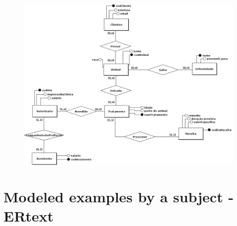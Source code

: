 \begin{figure}[!htb]
    \centering
    \includegraphics[scale=0.4]{postextuais/appendix/ExampleSubject-brModelo.png}
    \label{fig:my_label}
\end{figure}

\newpage

\section{Modeled examples by a subject - ERtext}

